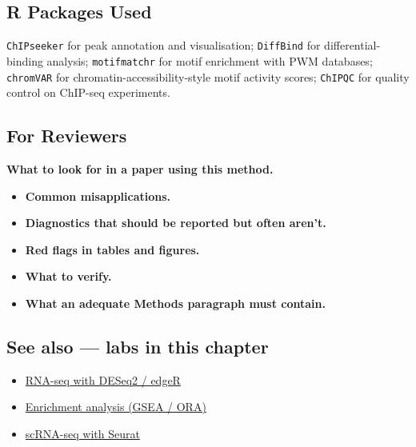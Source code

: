 \documentclass[
]{article}
\providecommand{\tightlist}{%
  \setlength{\itemsep}{0pt}\setlength{\parskip}{0pt}}
\begin{document}
\subsection{R Packages Used}\label{r-packages-used}

\texttt{ChIPseeker} for peak annotation and visualisation;
\texttt{DiffBind} for differential-binding analysis;
\texttt{motifmatchr} for motif enrichment with PWM databases;
\texttt{chromVAR} for chromatin-accessibility-style motif activity
scores; \texttt{ChIPQC} for quality control on ChIP-seq experiments.

\subsection{For Reviewers}\label{for-reviewers}

\textbf{What to look for in a paper using this method.}

\begin{itemize}
\tightlist
\item
  \textbf{Common misapplications.}
\item
  \textbf{Diagnostics that should be reported but often aren't.}
\item
  \textbf{Red flags in tables and figures.}
\item
  \textbf{What to verify.}
\item
  \textbf{What an adequate Methods paragraph must contain.}
\end{itemize}

\subsection{See also --- labs in this
chapter}\label{see-also-labs-in-this-chapter}

\begin{itemize}
\tightlist
\item
  \href{labs/lab-rna-seq-with-deseq2-edger.Rmd}{RNA-seq with DESeq2 /
  edgeR}
\item
  \href{labs/lab-enrichment-analysis-gsea-ora.Rmd}{Enrichment analysis
  (GSEA / ORA)}
\item
  \href{labs/lab-scrna-seq-with-seurat.Rmd}{scRNA-seq with Seurat}
\end{itemize}
\end{document}

